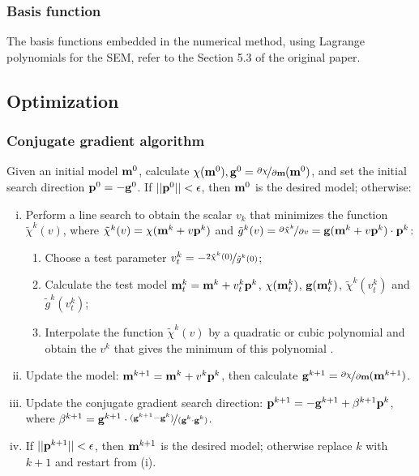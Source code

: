 \subsubsection{Basis function}
The basis functions embedded in the numerical method, using Lagrange polynomials for the SEM, refer to the Section 5.3 of the original paper.\par
\subsection{Optimization}
\subsubsection{Conjugate gradient algorithm}
Given an initial model $\mathbf{m}^0$, calculate $\chi(\mathbf{m}^0), \mathbf{g}^0=\nicefrac{\partial\chi}{\partial\mathbf{m}}(\mathbf{m}^0)$, and set the initial search direction $\mathbf{p}^0=-\mathbf{g}^0$. If $||\mathbf{p}^0||<\epsilon$, then $\mathbf{m}^0$ is the desired model; otherwise:
\begin{enumerate}[(i)]
  \item Perform a line search to obtain the scalar $v_k$ that minimizes the function $\tilde\chi^k(v)$, where $\tilde\chi^k(v)=\chi(\mathbf{m}^k+v\mathbf{p}^k)$ and $\tilde g^k(v)=\nicefrac{\partial\tilde\chi^k}{\partial v}=\mathbf{g}(\mathbf{m}^k+v\mathbf{p}^k)\cdot\mathbf{p}^k$:
  \begin{enumerate}[$\bullet$]
    \item Choose a test parameter $v_t^k=-\nicefrac{2\tilde\chi^k(0)}{\tilde g^k(0)}$;
    \item Calculate the test model $\mathbf{m}_t^k=\mathbf{m}^k+v_t^k\mathbf{p}^k$, $\chi(\mathbf{m}_t^k)$, $\mathbf{g}(\mathbf{m}_t^k)$, $\tilde\chi^k(v_t^k)$ and $\tilde g^k(v_t^k)$;
    \item Interpolate the function $\tilde\chi^k(v)$ by a quadratic or cubic polynomial  and obtain the $v^k$ that gives the minimum of this polynomial .
  \end{enumerate}
  \item Update the model: $\mathbf{m}^{k+1}=\mathbf{m}^k+v^k\mathbf{p}^k$, then calculate $\mathbf{g}^{k+1}=\nicefrac{\partial\chi}{\partial\mathbf{m}}(\mathbf{m}^{k+1})$.
  \item Update the conjugate gradient search direction: $\mathbf{p}^{k+1}=-\mathbf{g}^{k+1}+\beta^{k+1}\mathbf{p}^k$, where $\beta^{k+1}=\mathbf{g}^{k+1}\cdot\nicefrac{(\mathbf{g}^{k+1}-\mathbf{g}^k)}{(\mathbf{g}^k\cdot\mathbf{g}^k)}$.
  \item If $||\mathbf{p}^{k+1}||<\epsilon$, then $\mathbf{m}^{k+1}$ is the desired model; otherwise replace $k$ with $k+1$ and restart from (i).
\end{enumerate}\par
